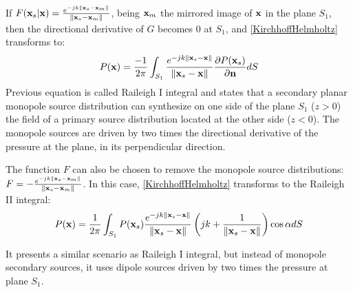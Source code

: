 If $F(\PosTheo[surface] \vert \PosTheo) = \GreenFunc[ {\PosTheo[surface] - \PosTheo[mirrored]} ]$, being $\PosTheo[mirrored]$ the mirrored image of $\PosTheo$ in the plane $S_1$, then the directional derivative of $G$ becomes $0$ at $S_1$, and \autoref{KirchhoffHelmholtz} transforms to:
\begin{equation}
P(\PosTheo) = \frac{-1}{2\pi} \int_{S_1} \GreenFunc[{\PosTheo[surface] - \PosTheo}] \frac{\partial P(\PosTheo[surface])}{\partial \mathbf{n}} dS
\label{RaileighI}
\end{equation}
Previous equation is called Raileigh I integral and states that a secondary planar monopole source distribution can synthesize on one side of the plane $S_1$ ($z>0$) the field of a primary source distribution located at the other side ($z<0$). The monopole sources are driven by two times the directional derivative of the pressure at the plane, in its perpendicular direction.

The function $F$ can also be chosen to remove the monopole source distributions: $F = -\GreenFunc[ {\PosTheo[surface] - \PosTheo[mirrored]} ]$. In this case, \autoref{KirchhoffHelmholtz} transforms to the Raileigh II integral:
\begin{equation}
P(\PosTheo) = \frac{1}{2\pi} \int_{S_1} P(\PosTheo[surface]) \GreenFunc[{\PosTheo[surface] - \PosTheo}] \left(jk + \frac{1}{\norm{\PosTheo[surface] - \PosTheo}}\right)\cos\normSecondPropAngle dS
\end{equation}

It presents a similar scenario as Raileigh I integral, but instead of monopole secondary sources, it uses dipole sources driven by two times the pressure at plane $S_1$.

